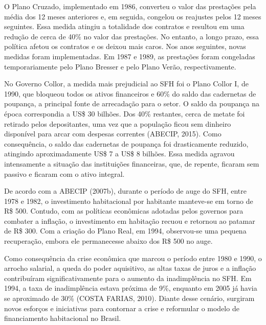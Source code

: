 \documentclass[
  12pt,
  a4paper,
]{scrreprt}
\begin{document}
O Plano Cruzado, implementado em 1986, converteu o valor das prestações
pela média dos 12 meses anteriores e, em seguida, congelou os reajustes
pelos 12 meses seguintes. Essa medida atingiu a totalidade dos contratos
e resultou em uma redução de cerca de 40\% no valor das prestações. No
entanto, a longo prazo, essa política afetou os contratos e os deixou
mais caros. Nos anos seguintes, novas medidas foram implementadas. Em
1987 e 1989, as prestações foram congeladas temporariamente pelo Plano
Bresser e pelo Plano Verão, respectivamente.

\vspace{12pt}

No Governo Collor, a medida mais prejudicial ao SFH foi o Plano Collor
I, de 1990, que bloqueou todos os ativos financeiros e 60\% do saldo das
cadernetas de poupança, a principal fonte de arrecadação para o setor. O
saldo da poupança na época correspondia a US\$ 30 bilhões. Dos 40\%
restantes, cerca de metate foi retirado pelos depositantes, uma vez que
a população ficou sem dinheiro disponível para arcar com despesas
correntes (ABECIP, 2015). Como consequência, o saldo das cadernetas de
poupança foi drasticamente reduzido, atingindo aproximadamente US\$ 7 a
US\$ 8 bilhões. Essa medida agravou intensamente a situação das
instituições financeiras, que, de repente, ficaram sem passivo e ficaram
com o ativo integral.

\vspace{12pt}

De acordo com a ABECIP (2007b), durante o período de auge do SFH, entre
1978 e 1982, o investimento habitacional por habitante manteve-se em
torno de R\$ 500. Contudo, com as políticas econômicas adotadas pelos
governos para combater a inflação, o investimento em habitação recuou e
retornou ao patamar de R\$ 300. Com a criação do Plano Real, em 1994,
observou-se uma pequena recuperação, embora ele permanecesse abaixo dos
R\$ 500 no auge.

\vspace{12pt}

Como consequência da crise econômica que marcou o período entre 1980 e
1990, o arrocho salarial, a queda do poder aquisitivo, as altas taxas de
juros e a inflação contribuíram significativamente para o aumento da
inadimplência no SFH. Em 1994, a taxa de inadimplência estava próxima de
9\%, enquanto em 2005 já havia se aproximado de 30\% (COSTA FARIAS,
2010). Diante desse cenário, surgiram novos esforços e iniciativas para
contornar a crise e reformular o modelo de financiamento habitacional no
Brasil.
\end{document}
